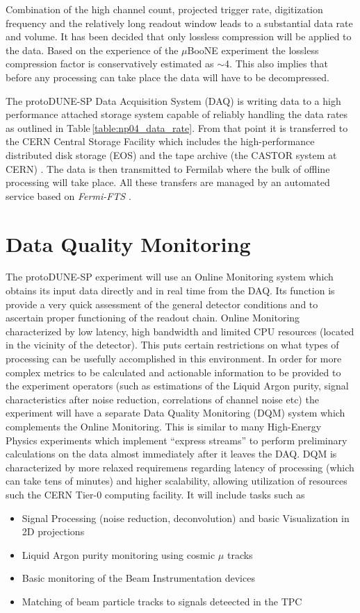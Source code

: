 \documentclass{PoS}
\newcommand{\pd}{protoDUNE\xspace}
\begin{document}
Combination of the high channel count, projected trigger rate, digitization frequency
and the relatively long readout window leads to a substantial data rate and volume. It has been decided that only
lossless compression will be applied to the data. Based on the experience of the $\mu$BooNE experiment \cite{uboone}
the lossless compression factor is conservatively estimated as $\sim$4. This also implies that before any processing can
take place the data will have to be decompressed.

The \pd-SP Data Acquisition System (DAQ) is writing data to a high performance attached storage system capable of reliably handling the data
rates as outlined in Table\,\ref{table:np04_data_rate}. From that point it is transferred to the CERN Central Storage
Facility which includes the high-performance distributed disk storage (EOS) and the tape archive (the CASTOR
system at CERN) \cite{castoreos}. The data is then transmitted to Fermilab where the bulk of offline processing
will take place.
All these transfers are managed by an automated service based on \textit{Fermi-FTS} \cite{sam,fts}.

\section{Data Quality Monitoring}
The protoDUNE-SP experiment will use an Online Monitoring system which obtains its input data directly
and in real time from the DAQ.
 Its function is provide a very quick assessment of the general detector conditions
and to ascertain proper functioning of the readout chain. Online Monitoring characterized by low latency, high bandwidth
and limited CPU resources (located in the vicinity of the detector). This puts certain restrictions on what types of processing
can be usefully accomplished in this environment.
In order for more complex metrics to be calculated and actionable information to be provided to the experiment operators
(such as estimations of the Liquid Argon purity, signal characteristics after noise reduction, correlations of channel noise etc) 
the experiment will have a separate Data Quality Monitoring (DQM) system which complements the Online Monitoring.
This is similar to many High-Energy Physics experiments which implement ``express streams'' to perform
preliminary calculations on the data almost immediately after it leaves the DAQ. DQM is characterized by more relaxed
requiremens regarding latency of processing (which can take tens of minutes) and higher scalability, allowing
utilization of resources such the CERN Tier-0 computing facility.
It will include tasks such as
\begin{itemize}
\item Signal Processing (noise reduction, deconvolution) and basic Visualization in 2D projections
\item Liquid Argon purity monitoring using cosmic $\mu$ tracks
\item Basic monitoring of the Beam Instrumentation devices
\item Matching of beam particle tracks to signals deteected in the TPC
\end{itemize}
\end{document}
